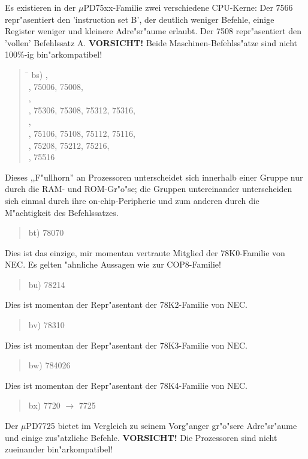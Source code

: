 \documentclass[12pt,a4paper,twoside]{report}
\begin{document}
Es existieren in der $\mu$PD75xx-Familie zwei verschiedene
CPU-Kerne: Der 7566 repr"asentiert den 'instruction set B', der
deutlich weniger Befehle, einige Register weniger und kleinere
Adre"sr"aume erlaubt.  Der 7508 repr"asentiert den 'vollen'
Befehlssatz A.  {\bf VORSICHT!} Beide Maschinen-Befehlss"atze
sind nicht 100\%-ig bin"arkompatibel!
\begin{quote}
\begin{tabbing}
\hspace{0.7cm} \= \kill
bs) , \\
    , 75006, 75008, \\
    , \\
    , 75306, 75308, 75312, 75316, \\
    , \\
    , 75106, 75108, 75112, 75116, \\
    , 75208, 75212, 75216, \\
    , 75516 \\
\end{tabbing}
\end{quote}
Dieses ,,F"ullhorn'' an Prozessoren unterscheidet sich innerhalb einer
Gruppe nur durch die RAM- und ROM-Gr"o"se; die Gruppen untereinander
unterscheiden sich einmal durch ihre on-chip-Peripherie und
zum anderen durch die M"achtigkeit des Befehlssatzes.
\begin{quote}
bt) 78070
\end{quote}
Dies ist das einzige, mir momentan vertraute Mitglied der
78K0-Familie von NEC.  Es gelten "ahnliche Aussagen wie zur
COP8-Familie!
\begin{quote}
bu) 78214
\end{quote}
Dies ist momentan der Repr"asentant der 78K2-Familie von NEC.
\begin{quote}
bv) 78310
\end{quote}
Dies ist momentan der Repr"asentant der 78K3-Familie von NEC.
\begin{quote}
bw) 784026
\end{quote}
Dies ist momentan der Repr"asentant der 78K4-Familie von NEC.
\begin{quote}
bx) 7720 $\rightarrow$ 7725
\end{quote}
Der $\mu$PD7725 bietet im Vergleich zu seinem Vorg"anger gr"o"sere
Adre"sr"aume und einige zus"atzliche Befehle. {\bf VORSICHT!}  Die
Prozessoren sind nicht zueinander bin"arkompatibel!
\end{document}
